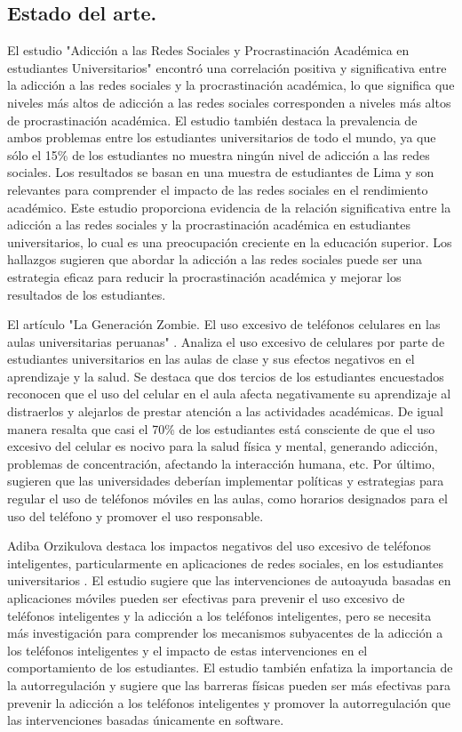 \subsection{Estado del arte.}

El estudio "Adicción a las Redes Sociales y Procrastinación Académica en estudiantes Universitarios" \cite{Luisa2019} encontró una correlación positiva y significativa entre la adicción a las redes sociales y la procrastinación académica, lo que significa que niveles más altos de adicción a las redes sociales corresponden a niveles más altos de procrastinación académica. El estudio también destaca la prevalencia de ambos problemas entre los estudiantes universitarios de todo el mundo, ya que sólo el 15\% de los estudiantes no muestra ningún nivel de adicción a las redes sociales. Los resultados se basan en una muestra de estudiantes de Lima y son relevantes para comprender el impacto de las redes sociales en el rendimiento académico. Este estudio proporciona evidencia de la relación significativa entre la adicción a las redes sociales y la procrastinación académica en estudiantes universitarios, lo cual es una preocupación creciente en la educación superior. Los hallazgos sugieren que abordar la adicción a las redes sociales puede ser una estrategia eficaz para reducir la procrastinación académica y mejorar los resultados de los estudiantes.

El artículo "La Generación Zombie. El uso excesivo de teléfonos celulares en las aulas universitarias peruanas" \cite{Montenegro2023}. Analiza el uso excesivo de celulares por parte de estudiantes universitarios en las aulas de clase y sus efectos negativos en el aprendizaje y la salud. Se destaca que dos tercios de los estudiantes encuestados reconocen que el uso del celular en el aula afecta negativamente su aprendizaje al distraerlos y alejarlos de prestar atención a las actividades académicas. De igual manera resalta que casi el 70\% de los estudiantes está consciente de que el uso excesivo del celular es nocivo para la salud física y mental, generando adicción, problemas de concentración, afectando la interacción humana, etc. Por último, sugieren que las universidades deberían implementar políticas y estrategias para regular el uso de teléfonos móviles en las aulas, como horarios designados para el uso del teléfono y promover el uso responsable.

Adiba Orzikulova destaca los impactos negativos del uso excesivo de teléfonos inteligentes, particularmente en aplicaciones de redes sociales, en los estudiantes universitarios \cite{Orzikulova2022}. El estudio sugiere que las intervenciones de autoayuda basadas en aplicaciones móviles pueden ser efectivas para prevenir el uso excesivo de teléfonos inteligentes y la adicción a los teléfonos inteligentes, pero se necesita más investigación para comprender los mecanismos subyacentes de la adicción a los teléfonos inteligentes y el impacto de estas intervenciones en el comportamiento de los estudiantes. El estudio también enfatiza la importancia de la autorregulación y sugiere que las barreras físicas pueden ser más efectivas para prevenir la adicción a los teléfonos inteligentes y promover la autorregulación que las intervenciones basadas únicamente en software.


